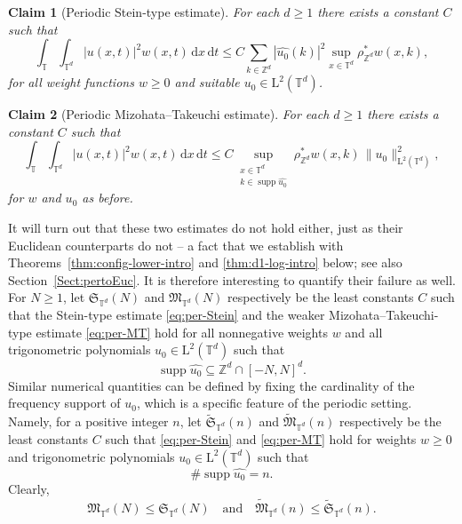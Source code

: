 \documentclass[11pt,reqno]{amsart}
\newtheorem*{claim}{Claim}
\numberwithin{equation}{section}
\newcommand{\supp}{\operatorname{supp}}
\newcommand{\dd}{\,\mathrm{d}}
\renewcommand{\leq}{\leqslant}
\renewcommand{\geq}{\geqslant}
\renewcommand{\ge}{\geqslant}
\begin{document}
\begin{claim}[Periodic Stein-type estimate]%
For each $d\geq 1$ there exists a constant $C$ such that
\begin{equation}\label{eq:per-Stein}
\int_{\mathbb{T}} \int_{\mathbb{T}^d} \left|u(x,t)\right|^2w(x,t)\dd x\dd t\leq C\sum_{k\in\mathbb{Z}^d}|\widehat{u_0}(k)|^2\sup_{x\in\mathbb{T}^d}\rho^{\ast}_{\mathbb{Z}^{d}}w(x,k),
\end{equation}
for all weight functions $w\geq0$ and suitable $u_0\in \mathrm{L}^2(\mathbb{T}^d)$. 
\end{claim}

\begin{claim}[Periodic Mizohata--Takeuchi estimate]%
For each $d\geq 1$ there exists a constant $C$ such that
\begin{equation}\label{eq:per-MT}
\int_{\mathbb{T}} \int_{\mathbb{T}^d} \left|u(x,t)\right|^2w(x,t)\dd x\dd t\leq C \sup_{\substack{x\in\mathbb{T}^d\\ k\in\supp\widehat{u_0}}}\rho^{\ast}_{\mathbb{Z}^{d}}w(x,k) \,\|u_0\|_{\mathrm{L}^2(\mathbb{T}^d)}^2,
\end{equation}
for $w$ and $u_0$ as before. 
\end{claim}

It will turn out that these two estimates do not hold either, just as their Euclidean counterparts do not -- a fact that we establish with Theorems~\ref{thm:config-lower-intro} and \ref{thm:d1-log-intro} below; see also Section~\ref{Sect:pertoEuc}. It is therefore interesting to quantify their failure as well.
For $N\ge1$, let $\mathfrak{S}_{\mathbb{T}^d}(N)$ and $\mathfrak{M}_{\mathbb{T}^d}(N)$ respectively be the least constants $C$ such that the Stein-type estimate \eqref{eq:per-Stein} and the weaker Mizohata--Takeuchi-type estimate \eqref{eq:per-MT} hold for all nonnegative weights $w$ and all trigonometric polynomials $u_0\in\mathrm{L}^2(\mathbb{T}^d)$ such that
\[ \supp\widehat{u_0} \subseteq \mathbb{Z}^d \cap [-N,N]^d. \]
Similar numerical quantities can be defined by fixing the cardinality of the frequency support of $u_0$, which is a specific feature of the periodic setting. Namely, for a positive integer $n$, let $\widetilde{\mathfrak{S}}_{\mathbb{T}^d}(n)$ and $\widetilde{\mathfrak{M}}_{\mathbb{T}^d}(n)$ respectively be the least constants $C$ such that \eqref{eq:per-Stein} and \eqref{eq:per-MT} hold for weights $w\geq0$ and trigonometric polynomials $u_0\in\mathrm{L}^2(\mathbb{T}^d)$ such that
\[ \#\supp\widehat{u_0} = n. \]
Clearly,
\begin{equation}\label{eq:per-MT_vs_St}
\mathfrak{M}_{\mathbb{T}^d}(N) \leq \mathfrak{S}_{\mathbb{T}^d}(N) \quad\text{and}\quad \widetilde{\mathfrak{M}}_{\mathbb{T}^d}(n) \leq \widetilde{\mathfrak{S}}_{\mathbb{T}^d}(n).
\end{equation}
\end{document}
